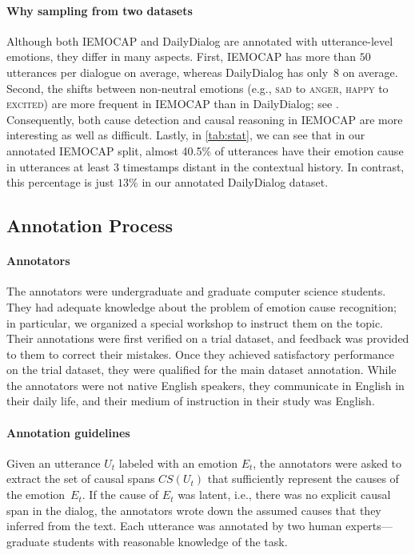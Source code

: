 \documentclass[smallextended]{svjour3}
\newcommand\emo[1]{\textsc{#1}}
\newcommand\DailyDialog{Daily\-Dialog}
\newcommand\0{\hphantom{0}}
\begin{document}
\paragraph{Why
sampling from two 
datasets} 
\label{sec:dataset_diffs}
Although both IEMOCAP and \DailyDialog{} are annotated with utterance-level emotions, they differ in many aspects. First, 
IEMOCAP has more than $50$ utterances per dialogue on average,
whereas \DailyDialog{} has 
only~$8$ on average. Second, the shifts between non-neutral emotions (e.g., \emo{sad} to \emo{anger}, \emo{happy} to \emo{excited}) are more frequent in IEMOCAP than in \DailyDialog{}; see \citep{ghosal2020utterancelevel}. Consequently, both cause detection and causal reasoning in IEMOCAP are more interesting as well as difficult. Lastly, in \cref{tab:stat}, we can see that in our annotated IEMOCAP split, almost 40.5\% of utterances have their emotion cause in utterances at least $3$ timestamps distant in the contextual history. 
In contrast,
this percentage is just $13\%$ in our annotated \DailyDialog{} dataset. 

\subsection{Annotation Process}\label{sec:annot}


\paragraph{Annotators}
The annotators were undergraduate and graduate computer science students. They had adequate knowledge about the problem of emotion cause recognition; in particular, we organized a special workshop to instruct them on the topic. Their annotations were first verified on a trial dataset, and feedback was provided to them to correct their mistakes. Once they achieved satisfactory performance on the trial dataset, they were qualified for the main dataset annotation. While the annotators were not native English speakers, they communicate in English in their daily life, and their medium of instruction in their study was English.


\paragraph{Annotation guidelines}
Given an utterance $U_t$ labeled with an emotion $E_t$, the annotators were asked to extract the set of causal spans $CS(U_t)$ 
that sufficiently represent the causes of the emotion~$E_t$. If the cause of $E_t$ was latent, i.e., there was no explicit causal span in the dialog,
the annotators wrote down the assumed causes that they inferred from the text. Each utterance was annotated by two human experts---graduate students with reasonable knowledge of the task.
\end{document}
